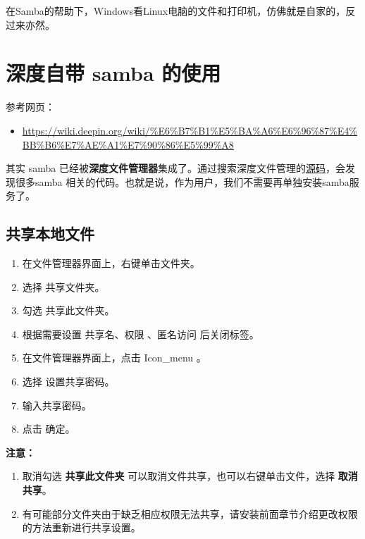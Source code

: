 \documentclass[doctor,openright,twoside]{sjtuthesis}
\providecommand{\tightlist}{%
    \setlength{\itemsep}{0pt}\setlength{\parskip}{0pt}}
\theoremstyle{plain}
\theoremstyle{definition}
\theoremstyle{remark}
\theoremstyle{ocrenumbox}
\theoremstyle{plain}
\begin{document}
在Samba的帮助下，Windows看Linux电脑的文件和打印机，仿佛就是自家的，反过来亦然。

\hypertarget{-samba-}{%
\section{深度自带 samba 的使用}\label{-samba-}}

参考网页：

\begin{itemize}
\tightlist
\item
  \url{https://wiki.deepin.org/wiki/\%E6\%B7\%B1\%E5\%BA\%A6\%E6\%96\%87\%E4\%BB\%B6\%E7\%AE\%A1\%E7\%90\%86\%E5\%99\%A8}
\end{itemize}

其实 samba
已经被\textbf{深度文件管理器}集成了。通过搜索深度文件管理的\href{https://github.com/linuxdeepin/dde-file-manager/search?q=samba\&unscoped_q=samba}{源码}，会发现很多samba
相关的代码。也就是说，作为用户，我们不需要再单独安装samba服务了。

\subsection{共享本地文件}

\begin{enumerate}
\def\labelenumi{\arabic{enumi}.}
\tightlist
\item
  在文件管理器界面上，右键单击文件夹。
\item
  选择 共享文件夹。
\item
  勾选 共享此文件夹。
\item
  根据需要设置 共享名、权限 、匿名访问 后关闭标签。
\item
  在文件管理器界面上，点击 Icon\_menu 。
\item
  选择 设置共享密码。
\item
  输入共享密码。
\item
  点击 确定。
\end{enumerate}

\textbf{注意：}

\begin{enumerate}
\def\labelenumi{\arabic{enumi}.}
\tightlist
\item
  取消勾选 \textbf{共享此文件夹}
  可以取消文件共享，也可以右键单击文件，选择 \textbf{取消共享}。
\item
  有可能部分文件夹由于缺乏相应权限无法共享，请安装前面章节介绍更改权限的方法重新进行共享设置。
\end{enumerate}
\end{document}
